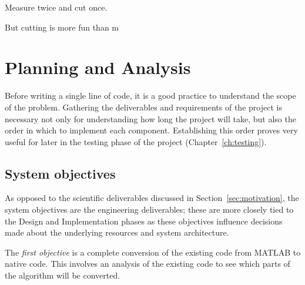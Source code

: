 \begin{savequote}[0.55\linewidth]
	\begin{fancyquote}
		Measure twice and cut once.
	\end{fancyquote}

	\begin{fancyquote}
		But cut\hspace{1em}ting is more fun than m\hspace{0.5em}\raisebox{-0.1em}{eas}\hspace{0.5em}\raisebox{-0.3em}{uri}\hspace{0.5em}\raisebox{-0.5em}{ng!}
	\end{fancyquote}
\end{savequote}

\chapter{Planning and Analysis}\label{ch:analysis}

Before writing a single line of code, it is a good practice to understand the
scope of the problem. Gathering the deliverables and requirements of the
project is necessary not only for understanding how long the project will take,
but also the order in which to implement each component. Establishing this
order proves very useful for later in the testing phase of the project
(Chapter~\ref{ch:testing}).

\section{System objectives}\label{sec:objectives}

As opposed to the scientific deliverables discussed in
Section~\ref{sec:motivation}, the system objectives are the engineering
deliverables; these are more closely tied to the Design and Implementation
phases as these objectives influence decisions made about the underlying
resources and system architecture.

The \emph{first objective} is a complete conversion of the
existing code from MATLAB to native code. This involves an analysis of the
existing code to see which parts of the algorithm will be converted.

